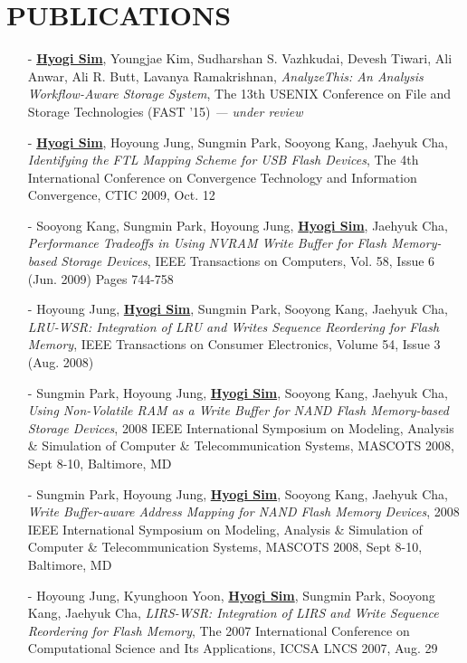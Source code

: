 \section{PUBLICATIONS} 
\vspace{0.2in}
\begin{itemize}[leftmargin=*]
\setlength\itemsep{-0.02in}
\item[-] \underline{\bf Hyogi Sim}, Youngjae Kim, Sudharshan S. Vazhkudai,
  Devesh Tiwari, Ali Anwar, Ali R. Butt, Lavanya Ramakrishnan,
  {\it AnalyzeThis: An Analysis Workflow-Aware Storage System},
  The 13th USENIX Conference on File and Storage Technologies (FAST '15)
  {\it \small --- under review}
\item[-] \underline{\bf Hyogi Sim}, Hoyoung Jung, Sungmin Park, Sooyong Kang, Jaehyuk Cha,
  {\it Identifying the FTL Mapping Scheme for USB Flash Devices},
  The 4th International Conference on Convergence Technology
  and Information Convergence, CTIC 2009, Oct. 12
\item[-] Sooyong Kang, Sungmin Park, Hoyoung Jung, \underline{\bf Hyogi Sim}, Jaehyuk Cha,
  {\it Performance Tradeoffs in Using NVRAM Write Buffer for Flash Memory-based
  Storage Devices},
  IEEE Transactions on Computers, Vol. 58, Issue 6 (Jun. 2009) Pages 744-758
\item[-] Hoyoung Jung, \underline{\bf Hyogi Sim}, Sungmin Park, Sooyong Kang, Jaehyuk Cha,
 {\it LRU-WSR: Integration of LRU and Writes Sequence Reordering for Flash
 Memory},
 IEEE Transactions on Consumer Electronics, Volume 54, Issue 3 (Aug. 2008)
\item[-] Sungmin Park, Hoyoung Jung, \underline{\bf Hyogi Sim}, Sooyong Kang, Jaehyuk Cha,
 {\it Using Non-Volatile RAM as a Write Buffer for NAND Flash Memory-based
 Storage Devices},
 2008 IEEE International Symposium on Modeling, Analysis \& Simulation of
 Computer \& Telecommunication Systems, MASCOTS 2008, Sept 8-10, Baltimore, MD
\item[-] Sungmin Park, Hoyoung Jung, \underline{\bf Hyogi Sim}, Sooyong Kang, Jaehyuk Cha,
 {\it Write Buffer-aware Address Mapping for NAND Flash Memory Devices},
 2008 IEEE International Symposium on Modeling, Analysis \& Simulation of
 Computer \& Telecommunication Systems, MASCOTS 2008, Sept 8-10, Baltimore, MD
\item[-] Hoyoung Jung, Kyunghoon Yoon, \underline{\bf Hyogi Sim},
 Sungmin Park, Sooyong Kang, Jaehyuk Cha,
 {\it LIRS-WSR: Integration of LIRS and Write Sequence Reordering for Flash
 Memory},
 The 2007 International Conference on Computational Science and Its
 Applications, ICCSA LNCS 2007, Aug. 29
\end{itemize}


